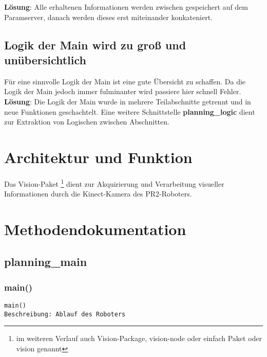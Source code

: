\documentclass{suturo}
\begin{document}
\textbf{Lösung}: Alle erhaltenen Informationen werden zwischen gespeichert auf dem Paramserver, danach werden dieses erst miteinander konkateniert.

\subsection*{Logik der Main wird zu groß und unübersichtlich}
Für eine sinnvolle Logik der Main ist eine gute Übersicht zu schaffen. Da die Logik der Main jedoch immer fulminanter wird passiere hier schnell Fehler.\\

\textbf{Lösung}: Die Logik der Main wurde in mehrere Teilabschnitte getrennt und in neue Funktionen geschachtelt. Eine weitere Schnittstelle \textbf{planning\_logic} dient zur Extraktion von Logischen zwischen Abschnitten.

\section*{Architektur und Funktion}
Das Vision-Paket \footnote{im weiteren Verlauf auch Vision-Package, vision-node oder einfach Paket oder vision genannt} dient zur Akquirierung und Verarbeitung visueller Informationen durch die Kinect-Kamera des PR2-Roboters.

      
\section*{Methodendokumentation}

\subsection{planning\_main}

\subsubsection{main()}
\begin{verbatim}
main()
Beschreibung: Ablauf des Roboters
\end{verbatim}
\end{document}
